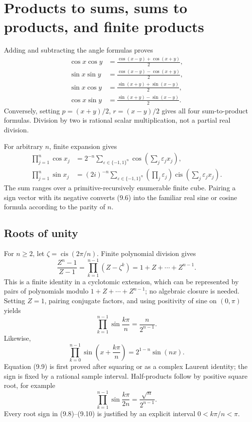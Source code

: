 \documentclass[11pt]{article}
\theoremstyle{definition}
\newcommand{\cis}{\operatorname{cis}}
\newcommand{\eps}{\varepsilon}
\begin{document}
\section{Products to sums, sums to products, and finite products}
\label{sec:products}

Adding and subtracting the angle formulas proves
\begin{align}
 \cos x\cos y&=\frac{\cos(x-y)+\cos(x+y)}2,\tag{9.1}\\
 \sin x\sin y&=\frac{\cos(x-y)-\cos(x+y)}2,\tag{9.2}\\
 \sin x\cos y&=\frac{\sin(x+y)+\sin(x-y)}2,\tag{9.3}\\
 \cos x\sin y&=\frac{\sin(x+y)-\sin(x-y)}2.\tag{9.4}
\end{align}
Conversely, setting \(p=(x+y)/2\), \(r=(x-y)/2\) gives all four
sum-to-product formulas.  Division by two is rational scalar multiplication,
not a partial real division.

For arbitrary \(n\), finite expansion gives
\begin{align}
 \prod_{j=1}^n\cos x_j
 &=2^{-n}\sum_{\eps\in\{-1,1\}^n}
   \cos\left(\sum_j\eps_jx_j\right),\tag{9.5}\\
 \prod_{j=1}^n\sin x_j
 &=(2i)^{-n}\sum_{\eps\in\{-1,1\}^n}
   \left(\prod_j\eps_j\right)
   \cis\left(\sum_j\eps_jx_j\right).
 \tag{9.6}
\end{align}
The sum ranges over a primitive-recursively enumerable finite cube.  Pairing a
sign vector with its negative converts (9.6) into the familiar real sine or
cosine formula according to the parity of \(n\).

\subsection{Roots of unity}

For \(n\ge2\), let \(\zeta=\cis(2\pi/n)\).  Finite polynomial division gives
\[
 \frac{Z^n-1}{Z-1}=\prod_{k=1}^{n-1}(Z-\zeta^k)
 =1+Z+\cdots+Z^{n-1}.
 \tag{9.7}
\]
This is a finite identity in a cyclotomic extension, which can be represented
by pairs of polynomials modulo \(1+Z+\cdots+Z^{n-1}\); no algebraic closure is
needed.  Setting \(Z=1\), pairing conjugate factors, and using positivity of
sine on \((0,\pi)\) yields
\[
 \prod_{k=1}^{n-1}\sin\frac{k\pi}{n}=\frac{n}{2^{n-1}}.
 \tag{9.8}
\]
Likewise,
\[
 \prod_{k=0}^{n-1}\sin\left(x+\frac{k\pi}{n}\right)
 =2^{1-n}\sin(nx).
 \tag{9.9}
\]
Equation (9.9) is first proved after squaring or as a complex Laurent identity;
the sign is fixed by a rational sample interval.  Half-products follow by
positive square root, for example
\[
 \prod_{k=1}^{n-1}\sin\frac{k\pi}{2n}
 =\frac{\sqrt n}{2^{n-1}}.
 \tag{9.10}
\]
Every root sign in (9.8)--(9.10) is justified by an explicit interval
\(0<k\pi/n<\pi\).
\end{document}
